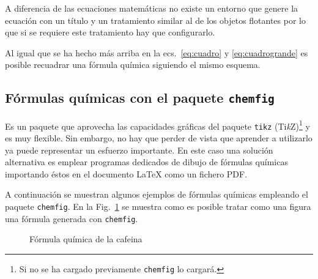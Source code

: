 \documentclass[11pt,a4paper]{article}
\begin{document}
A diferencia de las ecuaciones matemáticas no existe un entorno que genere la ecuación con un título y un tratamiento similar al de los objetos flotantes por lo que si se requiere este tratamiento hay que configurarlo.

Al igual que se ha hecho más arriba en la ecs.~\ref{eq:cuadro} y \ref{eq:cuadrogrande} es posible recuadrar una fórmula química siguiendo el mismo esquema.

\begin{center}
{\fboxsep 8pt \fboxrule 0.5pt
}
\end{center}




\subsection{Fórmulas químicas con el paquete \texttt{chemfig}}
Es un paquete que aprovecha las capacidades gráficas del paquete \texttt{tikz} (Ti\textit{k}Z)\footnote{Si no se ha cargado previamente \texttt{chemfig} lo cargará.} y es muy flexible. Sin embargo, no hay que perder de vista que aprender a utilizarlo ya puede representar un esfuerzo importante. En este caso una solución alternativa es emplear programas dedicados de dibujo de fórmulas químicas importando éstos en el documento \LaTeX{} como un fichero PDF.

A continuación se muestran algunos ejemplos de fórmulas químicas empleando el paquete \texttt{chemfig}. En la Fig.~\ref{fig:cafeina} se muestra como es posible tratar como una figura una fórmula generada con \texttt{chemfig}.


\begin{figure}[!h]
	\begin{center}
	\end{center}
	\caption{Fórmula química de la cafeina}\label{fig:cafeina}
\end{figure}



\begin{center}
\end{center}
\end{document}
